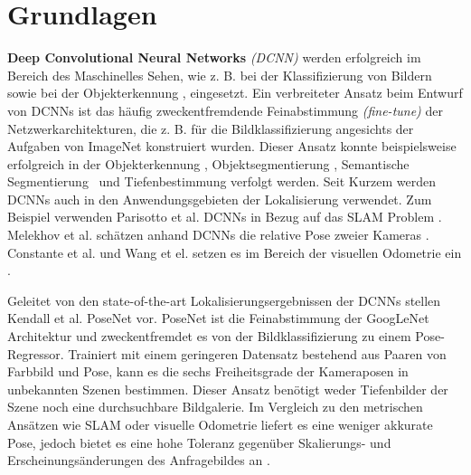 \pagebreak
\section{Grundlagen}




\pagebreak
\textbf{Deep Convolutional Neural Networks} \textit{(DCNN)} werden erfolgreich im Bereich des Maschinelles Sehen, wie z. B. bei der Klassifizierung von Bildern \cite{krizhevskyImageNetClassificationDeep2012, simonyanVeryDeepConvolutional2014, heDeepResidualLearning2015} sowie bei der  Objekterkennung \cite{girshickRichFeatureHierarchies2013, renFasterRCNNRealTime2015b, girshickFastRCNN2015},  eingesetzt. 
Ein verbreiteter Ansatz beim Entwurf von DCNNs ist das häufig zweckentfremdende Feinabstimmung \textit{(fine-tune)} der Netzwerkarchitekturen, die z. B. für die Bildklassifizierung angesichts der Aufgaben von ImageNet \cite{russakovskyImageNetLargeScale2014} konstruiert wurden. Dieser Ansatz konnte beispielsweise erfolgreich in der Objekterkennung \cite{girshickFastRCNN2015}, Objektsegmentierung \cite{kokkinosPushingBoundariesBoundary2015, maninisConvolutionalOrientedBoundaries2016}, Semantische Segmentierung \cite{nohLearningDeconvolutionNetwork2015, hazirbasFuseNetIncorporatingDepth2017a} und Tiefenbestimmung \cite{liDepthSurfaceNormal2015} verfolgt werden.
Seit Kurzem werden DCNNs auch in den Anwendungsgebieten der Lokalisierung verwendet. Zum Beispiel verwenden Parisotto et al. DCNNs in Bezug auf das SLAM Problem \cite{parisottoGlobalPoseEstimation2018}. Melekhov et al. schätzen anhand DCNNs die relative Pose zweier Kameras \cite{melekhovRelativeCameraPose2017}. Constante et al. und Wang et el. setzen es im Bereich der visuellen Odometrie ein \cite{costanteExploringRepresentationLearning2016, wangDeepVOEndtoendVisual2017}.

Geleitet von den state-of-the-art Lokalisierungsergebnissen der DCNNs stellen Kendall et al. PoseNet \cite{kendallPoseNetConvolutionalNetwork2015} vor.
PoseNet ist die Feinabstimmung der GoogLeNet \cite{szegedyGoingDeeperConvolutions2015} Architektur und zweckentfremdet es von der Bildklassifizierung zu einem Pose-Regressor. Trainiert mit einem geringeren Datensatz bestehend aus Paaren von Farbbild und Pose, kann es die sechs Freiheitsgrade der Kameraposen in unbekannten Szenen bestimmen. Dieser Ansatz benötigt weder Tiefenbilder der Szene noch eine durchsuchbare Bildgalerie. Im Vergleich zu den metrischen Ansätzen wie SLAM oder visuelle Odometrie liefert es eine weniger akkurate Pose, jedoch bietet es eine hohe Toleranz gegenüber Skalierungs- und Erscheinungsänderungen des Anfragebildes an \cite{piascoSurveyVisualBasedLocalization2018}.


